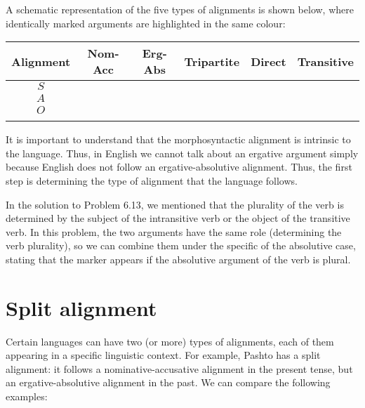 \begin{refsection}
\begin{mysolution}
A schematic representation of the five types of alignments is shown below, where identically marked arguments are highlighted in the same colour:

\begin{table}[H]
  \begin{tabular}{cccccc}
  \lsptoprule
  Alignment & {Nom-Acc} & {Erg-Abs} & {Tripartite} & {Direct} & {Transitive} \\\midrule
  $S$ & \cellcolor[HTML]{aeaeae} & \cellcolor[HTML]{aeaeae} & \cellcolor[HTML]{aeaeae} & \cellcolor[HTML]{aeaeae} & \\
  $A$ & \cellcolor[HTML]{aeaeae} & & & \cellcolor[HTML]{aeaeae} & \cellcolor[HTML]{aeaeae} \\
  $O$ & & \cellcolor[HTML]{aeaeae} & \cellcolor[HTML]{878787} & \cellcolor[HTML]{aeaeae} & \cellcolor[HTML]{aeaeae}\\
  \lspbottomrule
\end{tabular}
\end{table}

It is important to understand that the morphosyntactic alignment is intrinsic to the language. Thus, in English we cannot talk about an ergative argument simply because English does not follow an ergative-absolutive alignment. Thus, the first step is determining the type of alignment that the language follows.

In the solution to Problem 6.13, we mentioned that the plurality of the verb is determined by the subject of the intransitive verb or the object of the transitive verb. In this problem, the two arguments have the same role (determining the verb plurality), so we can combine them under the specific of the absolutive case, stating that the marker  appears if the absolutive argument of the verb is plural.
\end{mysolution}

\section{Split alignment}

Certain languages can have two (or more) types of alignments, each of them appearing in a specific linguistic context. For example, Pashto has a split alignment: it follows a nominative-accusative alignment in the present tense, but an ergative-absolutive alignment in the past. We can compare the following examples:


\end{refsection}
